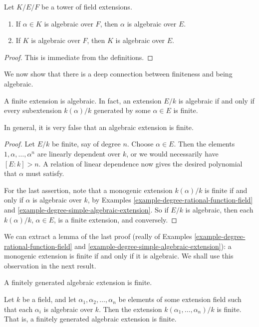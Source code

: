 \begin{lemma}
\label{lemma-algebraic-goes-up}
Let $K/E/F$ be a tower of field extensions.
\begin{enumerate}
\item If $\alpha \in K$ is algebraic over $F$, then $\alpha$ is algebraic
over $E$.
\item If $K$ is algebraic over $F$, then $K$ is algebraic over $E$.
\end{enumerate}
\end{lemma}

\begin{proof}
This is immediate from the definitions.
\end{proof}

\noindent
We now show that there is a deep connection between finiteness and being
algebraic.

\begin{lemma}
\label{lemma-finite-is-algebraic}
A finite extension is algebraic. In fact, an extension $E/k$ is algebraic
if and only if every subextension $k(\alpha)/k$ generated by some
$\alpha \in E$ is finite.
\end{lemma}

\noindent
In general, it is very false that an algebraic extension is finite.

\begin{proof}
Let $E/k$ be finite, say of degree $n$. Choose $\alpha \in E$. Then the
elements $1, \alpha, \ldots, \alpha^n$ are linearly
dependent over $k$, or we would necessarily have $[E : k] > n$. A relation of
linear dependence now gives the desired polynomial that $\alpha$ must satisfy.

\medskip\noindent
For the last assertion, note that a monogenic extension $k(\alpha)/k$ is
finite if and only if $\alpha$ is algebraic over $k$, by
Examples \ref{example-degree-rational-function-field} and
\ref{example-degree-simple-algebraic-extension}.
So if $E/k$ is algebraic, then each $k(\alpha)/k$, $\alpha \in E$, is a finite
extension, and conversely.
\end{proof}

\noindent
We can extract a lemma of the last proof (really of
Examples \ref{example-degree-rational-function-field} and
\ref{example-degree-simple-algebraic-extension}):
a monogenic extension is finite if and only if it is algebraic.
We shall use this observation in the next result.

\begin{lemma}
\label{lemma-algebraic-finitely-generated}
\begin{slogan}
A finitely generated algebraic extension is finite.
\end{slogan}
Let $k$ be a field, and let $\alpha_1, \alpha_2, \ldots, \alpha_n$ be elements
of some extension field such that each $\alpha_i$ is algebraic over $k$. Then
the extension $k(\alpha_1, \ldots, \alpha_n)/k$ is finite.
That is, a finitely generated algebraic extension is finite.
\end{lemma}


